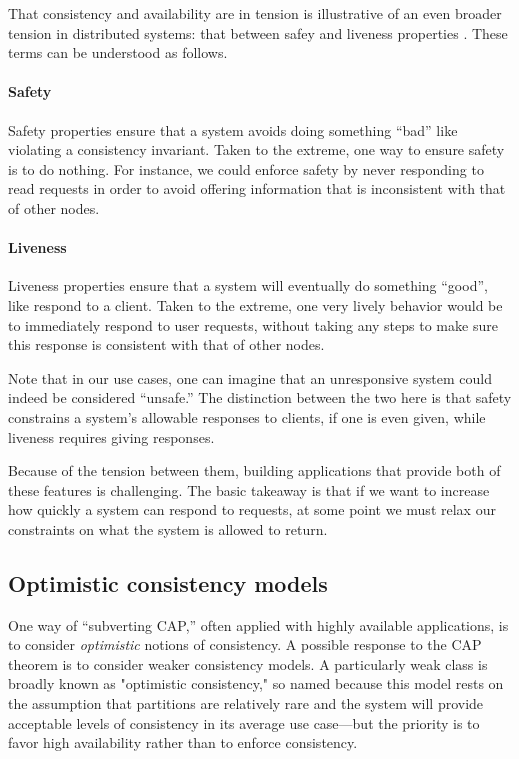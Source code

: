 That consistency and availability are in tension is illustrative of an
even broader tension in distributed systems: that between safey and
liveness properties \cite{}. These terms can be understood as
follows.

\paragraph{Safety}
Safety properties ensure that a system avoids doing something ``bad''
like violating a consistency invariant. Taken to the extreme, one way
to ensure safety is to do nothing. For instance, we could enforce
safety by never responding to read requests in order to avoid offering
information that is inconsistent with that of other nodes.

\paragraph{Liveness}
Liveness properties ensure that a system will eventually do something
``good'', like respond to a client. Taken to the extreme, one very
lively behavior would be to immediately respond to user requests,
without taking any steps to make sure this response is consistent with
that of other nodes.

Note that in our use cases, one can imagine that an unresponsive
system could indeed be considered ``unsafe.'' The distinction between
the two here is that safety constrains a system's allowable responses
to clients, if one is even given, while liveness requires giving
responses.

Because of the tension between them, building applications that
provide both of these features is challenging. The basic takeaway is
that if we want to increase how quickly a system can respond to
requests, at some point we must relax our constraints on what the
system is allowed to return.

\subsection{Optimistic consistency models}
One way of ``subverting CAP,'' often applied with highly available
applications, is to consider \emph{optimistic} notions of consistency.  A
possible response to the CAP theorem is to consider weaker consistency
models. A particularly weak class is broadly known as "optimistic
consistency," so named because this model rests on the assumption that
partitions are relatively rare and the system will provide acceptable
levels of consistency in its average use case---but the priority is to
favor high availability rather than to enforce consistency.


